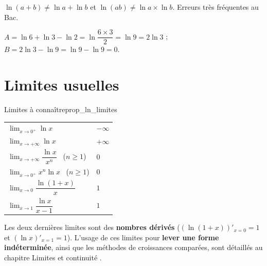 \begin{attention}
	$\ln(a+b)\neq\ln a+\ln b$ \quad et \quad $\ln(ab)\neq\ln a\times\ln b$.
	Erreurs très fréquentes au Bac.
\end{attention}

\begin{exemple}
	$A=\ln 6+\ln 3-\ln 2=\ln\dfrac{6\times 3}{2}=\ln 9=2\ln 3$ ;
	\qquad
	$B=2\ln 3-\ln 9=\ln 9-\ln 9=0$.
\end{exemple}


\section{Limites usuelles}

\begin{propriete}{Limites à connaître}{prop_ln_limites}
	\begin{center}
	\renewcommand{\arraystretch}{2.0}
	\begin{tabular}{>{\raggedright\arraybackslash}p{5.4cm}
	                >{\centering\arraybackslash}p{2.0cm}}
	\hline
	$\displaystyle\lim_{x\to 0^+}\ln x$                       & $-\infty$ \\
	$\displaystyle\lim_{x\to +\infty}\ln x$                   & $+\infty$ \\
	$\displaystyle\lim_{x\to+\infty}\dfrac{\ln x}{x^{n}}$ \ ($n\geq 1$) & $0$ \\
	$\displaystyle\lim_{x\to 0^+}x^{n}\ln x$ \ ($n\geq 1$)    & $0$ \\
	$\displaystyle\lim_{x\to 0}\dfrac{\ln(1+x)}{x}$           & $1$ \\
	$\displaystyle\lim_{x\to 1}\dfrac{\ln x}{x-1}$            & $1$ \\
	\hline
	\end{tabular}
	\end{center}
\end{propriete}

\begin{remarque}
	Les deux dernières limites sont des \textbf{nombres dérivés}
	($(\ln(1+x))'_{x=0}=1$ et $(\ln x)'_{x=1}=1$). L'usage de ces limites pour
	\textbf{lever une forme indéterminée}, ainsi que les méthodes de
	croissances comparées, sont détaillés au chapitre
	\og Limites et continuité \fg.
\end{remarque}



